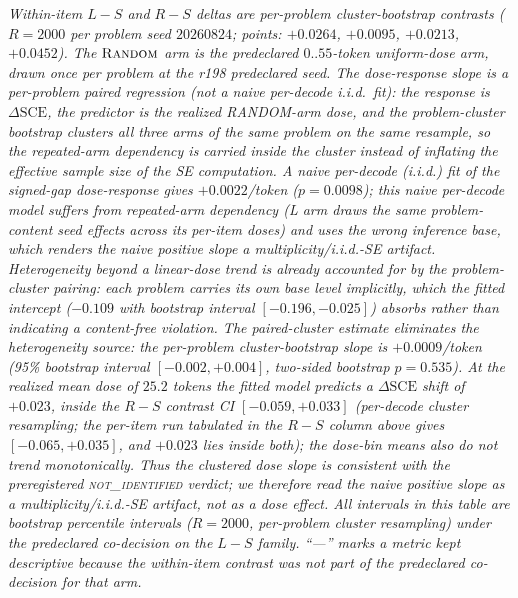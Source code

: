 \documentclass{article}
\begin{document}
\begin{table}[t]
\begin{minipage}{\linewidth}\small\emph{Within-item $L{-}S$ and $R{-}S$ deltas are per-problem cluster-bootstrap contrasts
($R{=}2000$ per problem seed $20260824$; points: $+0.0264$, $+0.0095$, $+0.0213$, $+0.0452$).
The $\textsc{Random}$ arm is the predeclared $0..55$-token uniform-dose arm, drawn
once per problem at the r198 predeclared seed.  The dose-response slope is a
per-problem paired regression (not a naive per-decode i.i.d.\ fit): the response is
$\Delta\mathrm{SCE}$, the predictor is the realized RANDOM-arm dose, and the
problem-cluster bootstrap clusters all three arms of the same problem on the same
resample, so the repeated-arm dependency is carried inside the cluster instead of
inflating the effective sample size of the SE computation.  A naive per-decode
(i.i.d.) fit of the signed-gap dose-response gives $+0.0022$/token ($p{=}0.0098$); this
naive per-decode model suffers from repeated-arm dependency (L arm draws the same
problem-content seed effects across its per-item doses) and uses the wrong
inference base, which renders the naive positive slope a multiplicity/i.i.d.-SE
artifact.  Heterogeneity beyond a linear-dose trend is already accounted for by the problem-cluster pairing: each problem carries
its own base level implicitly, which the fitted intercept
($-0.109$ with bootstrap interval $[-0.196,-0.025]$)
absorbs rather than indicating a content-free violation.  The paired-cluster estimate eliminates the heterogeneity
source: the per-problem cluster-bootstrap slope is $+0.0009$/token (95\% bootstrap
interval $[-0.002,+0.004]$, two-sided bootstrap $p{=}0.535$).  At the realized mean dose of $25.2$ tokens the fitted model
predicts a $\Delta\mathrm{SCE}$ shift of $+0.023$, inside the $R{-}S$ contrast CI
$[-0.059,+0.033]$ (per-decode cluster resampling; the per-item run tabulated in the
$R{-}S$ column above gives $[-0.065,+0.035]$, and $+0.023$ lies inside both);
the dose-bin means also do not trend monotonically.  Thus the
clustered dose slope is consistent with the preregistered \textsc{not\_identified}
verdict; we therefore read the naive positive slope as a multiplicity/i.i.d.-SE
artifact, not as a dose effect.  All intervals in this table are bootstrap
percentile intervals ($R{=}2000$, per-problem cluster resampling) under the
predeclared co-decision on the $L{-}S$ family.  ``---'' marks a metric kept
descriptive because the within-item contrast
was not part of the predeclared co-decision for that arm.}
\end{minipage}
\end{table}
\end{document}

